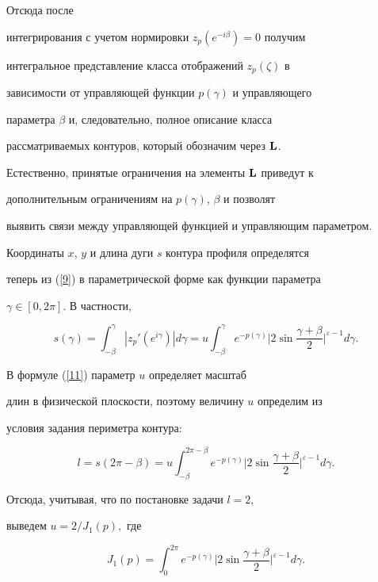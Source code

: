 Отсюда после


интегрирования с учетом нормировки $z_{p}(e^{-i\beta})=0$ получим


интегральное представление класса отображений $ z_{p}(\zeta)$ в


зависимости от управляющей функции $p(\gamma)$ и управляющего


параметра $\beta$ и, следовательно, полное описание класса


рассматриваемых контуров, который обозначим через ${\bold L}$.


Естественно, принятые ограничения на элементы ${\bold L}$ приведут к


дополнительным ограничениям на $p(\gamma)$, $\beta$ и позволят


выявить связи между управляющей функцией и управляющим параметром.





Координаты $x$, $y$ и длина дуги $s$ контура профиля определятся


теперь из (\ref{9}) в параметрической форме как функции параметра


$\gamma \in [0, 2\pi ]$. В частности,


\begin{equation}\label{11}


s(\gamma)=\int_{-\beta}^{\gamma}|


z_{p}' (e^{i\gamma})| d\gamma= u\int_{-\beta}^{\gamma}


e^{-p(\gamma)}\bigg|2\sin\frac{\gamma+\beta}{2}\bigg|^{\varepsilon-1}d\gamma.


\end{equation}


В формуле (\ref{11}) параметр $u$ определяет масштаб


длин в физической плоскости, поэтому величину $u$ определим из


условия задания периметра контура:


$$


l=s(2\pi-\beta)=u\int_{-\beta}^{2\pi-\beta}


e^{-p(\gamma)}\bigg|2\sin\frac{\gamma+\beta}{2}\bigg|^{\varepsilon-1}d\gamma.


$$


Отсюда, учитывая, что по постановке задачи $l=2$,


выведем $ u=2/J_{1}(p),$ где


\begin{equation}\label{12}


J_{1}(p)=\int_{0}^{2\pi}


e^{-p(\gamma)}\bigg|2\sin\frac{\gamma+\beta}{2}\bigg|^{\varepsilon-1}d\gamma.


\end{equation}


